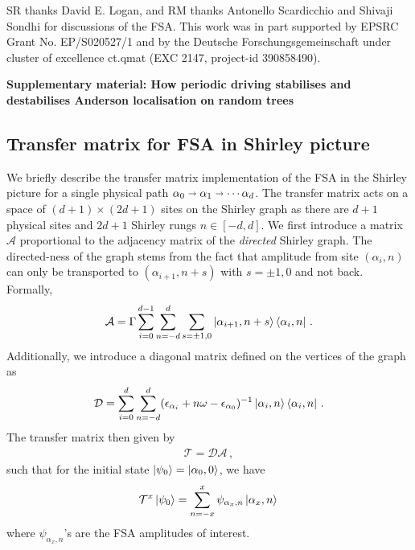\documentclass[aps,prl,twocolumn,superscriptaddress,nobalancelastpage,longbibliography]{revtex4-2}
\newcommand\eq[1]{\begin{align}#1\end{align}}
\begin{document}
\begin{acknowledgments}
SR thanks David E. Logan, and RM thanks Antonello Scardicchio and Shivaji Sondhi for discussions of the FSA.
This work was in part supported by EPSRC Grant No. EP/S020527/1 and by the Deutsche Forschungsgemeinschaft  under  cluster of excellence ct.qmat (EXC 2147, project-id 390858490).
\end{acknowledgments}









\clearpage
{
\onecolumngrid
\begin{center}
\textbf{Supplementary material: How periodic driving stabilises and destabilises Anderson localisation on random trees}\\

\end{center}
\bigskip
}

\twocolumngrid

\setcounter{equation}{0}
\renewcommand{\theequation}{S\arabic{equation}}
\setcounter{figure}{0}
\renewcommand{\thefigure}{S\arabic{figure}}
\setcounter{page}{1}
\renewcommand{\thepage}{S\arabic{page}}





\subsection{Transfer matrix for FSA in Shirley picture}
We briefly describe the transfer matrix implementation of the FSA in the Shirley picture for a single physical path $\alpha_0\shortrightarrow\alpha_1\shortrightarrow\cdots\alpha_d$.
The transfer matrix acts on a space of $(d+1)\times (2d+1)$ sites on the Shirley graph as there are $d+1$ physical sites and $2d+1$ Shirley rungs $n\in[-d,d]$.
We first introduce a matrix $\mathcal{A}$ proportional to the adjacency matrix of the \emph{directed} Shirley graph.
The directed-ness of the graph stems from the fact that amplitude from site $(\alpha_i,n)$ can only be transported to $(\alpha_{i+1},n+s)$ with $s=\pm1,0$ and not back. Formally, 
\eq{
\mathcal{A} =\Gamma \sum_{i=0}^{d-1}\sum_{n=-d}^d\sum_{s=\pm1,0}\ket{\alpha_{i+1},n+s}\bra{\alpha_i,n}\,.
}
Additionally, we introduce a diagonal matrix defined on the vertices of the graph as 
\eq{
\mathcal{D} = \sum_{i=0}^d\sum_{n=-d}^d(\epsilon_{\alpha_i}+n\omega-\epsilon_{\alpha_0})^{-1}\ket{\alpha_i,n}\bra{\alpha_i,n}\,.
}
The transfer matrix then given by 
\eq{
\mathcal{T}= \mathcal{D}\mathcal{A}\,,
}
such that for the initial state $\ket{\psi_0}=\ket{\alpha_0,0}$, we have
\eq{
\mathcal{T}^x\ket{\psi_0}=\sum_{n=-x}^x\psi_{\alpha_x,n}\ket{\alpha_x,n}\,
}
where $\psi_{\alpha_x,n}$'s are the FSA amplitudes of interest.
\end{document}
